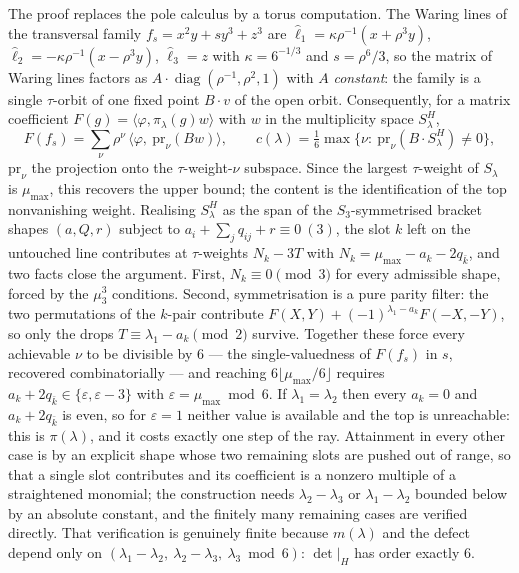 \documentclass[11pt,reqno]{amsart}
\theoremstyle{plain}
\theoremstyle{definition}
\begin{document}
The proof replaces the pole calculus by a torus computation.  The Waring lines
of the transversal family $f_s=x^{2}y+sy^{3}+z^{3}$ are
$\hat\ell_1=\kappa\rho^{-1}(x+\rho^{3}y)$,
$\hat\ell_2=-\kappa\rho^{-1}(x-\rho^{3}y)$, $\hat\ell_3=z$ with
$\kappa=6^{-1/3}$ and $s=\rho^{6}/3$, so the matrix of Waring lines factors as
$A\cdot\operatorname{diag}(\rho^{-1},\rho^{2},1)$ with $A$ \emph{constant}:
the family is a single $\tau$-orbit of one fixed point $B\cdot v$ of the open
orbit.  Consequently, for a matrix coefficient
$F(g)=\langle\varphi,\pi_\lambda(g)w\rangle$ with $w$ in the multiplicity space
$S_\lambda^{H}$,
\[
  F(f_s)=\sum_{\nu}\rho^{\nu}\,\langle\varphi,\ \mathrm{pr}_{\nu}(Bw)\rangle,
  \qquad
  c(\lambda)=\tfrac16\max\{\nu:\ \mathrm{pr}_{\nu}(B\cdot S_\lambda^{H})\neq0\},
\]
$\mathrm{pr}_\nu$ the projection onto the $\tau$-weight-$\nu$ subspace.  Since
the largest $\tau$-weight of $S_\lambda$ is $\mu_{\max}$, this recovers the
upper bound; the content is the identification of the top nonvanishing weight.
Realising $S_\lambda^{H}$ as the span of the $S_3$-symmetrised bracket shapes
$(a,Q,r)$ subject to $a_i+\sum_j q_{ij}+r\equiv0\ (3)$, the slot $k$ left on the
untouched line contributes at $\tau$-weights $N_k-3T$ with
$N_k=\mu_{\max}-a_k-2q_{\bar k}$, and two facts close the argument.  First,
$N_k\equiv0\pmod 3$ for every admissible shape, forced by the $\mu_3^{3}$
conditions.  Second, symmetrisation is a pure parity filter: the two
permutations of the $k$-pair contribute
$F(X,Y)+(-1)^{\lambda_1-a_k}F(-X,-Y)$, so only the drops
$T\equiv\lambda_1-a_k\pmod2$ survive.  Together these force every achievable
$\nu$ to be divisible by $6$ --- the single-valuedness of $F(f_s)$ in $s$,
recovered combinatorially --- and reaching $6\lfloor\mu_{\max}/6\rfloor$
requires $a_k+2q_{\bar k}\in\{\varepsilon,\varepsilon-3\}$ with
$\varepsilon=\mu_{\max}\bmod6$.  If $\lambda_1=\lambda_2$ then every $a_k=0$ and
$a_k+2q_{\bar k}$ is even, so for $\varepsilon=1$ neither value is available and
the top is unreachable: this is $\pi(\lambda)$, and it costs exactly one step of
the ray.  Attainment in every other case is by an explicit shape whose two
remaining slots are pushed out of range, so that a single slot contributes and
its coefficient is a nonzero multiple of a straightened monomial; the
construction needs $\lambda_2-\lambda_3$ or $\lambda_1-\lambda_2$ bounded below
by an absolute constant, and the finitely many remaining cases are verified
directly.  That verification is genuinely finite because $m(\lambda)$ and the
defect depend only on
$(\lambda_1-\lambda_2,\ \lambda_2-\lambda_3,\ \lambda_3\bmod 6)$: $\det|_H$ has
order exactly $6$.
\end{document}
